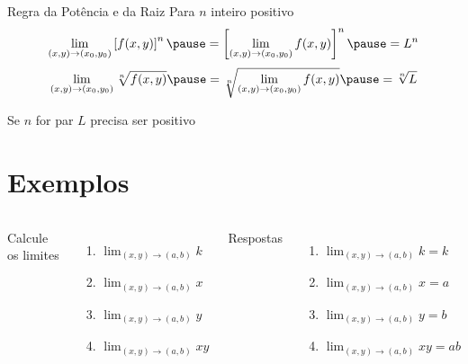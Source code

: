 \begin{frame}{Regra da Potência e da Raiz}
  Para $n$ inteiro positivo
  \pause
  \[
    \lim_{(x, y)\to(x_0, y_0)} \left[f(x, y)\right]^n
    \pause =
    \left[\lim_{(x, y)\to(x_0, y_0)} f(x, y)\right]^n
    \pause =
    L^n
  \]
  \pause
  \vspace{\baselineskip}
  \[
    \lim_{(x, y)\to(x_0, y_0)} \sqrt[n]{f(x, y)}
    \pause =
    \sqrt[n]{\lim_{(x, y)\to(x_0, y_0)} f(x, y)}
    \pause =
    \sqrt[n]{L}
  \]

  \pause
  Se $n$ for par $L$ precisa ser positivo
\end{frame}

\section{Exemplos}

\begin{question}
\begin{columns}[t]
  Calcule os limites
  \vspace{0.5\baselineskip}
  \begin{enumerate}
    \setlength\itemsep{1.5em}
    \item \(\lim_{(x, y)\to(a, b)} k\)
    \item \(\lim_{(x, y)\to(a, b)} x\)
    \item \(\lim_{(x, y)\to(a, b)} y\)
    \item \(\lim_{(x, y)\to(a, b)} xy\)
  \end{enumerate}
  \pause
  Respostas
  \pause
  \vspace{0.5\baselineskip}
  \begin{enumerate}[<+->]
    \setlength\itemsep{1.5em}
    \item \(\lim_{(x, y)\to(a, b)} k  = k  \)
    \item \(\lim_{(x, y)\to(a, b)} x  = a  \)
    \item \(\lim_{(x, y)\to(a, b)} y  = b  \)
    \item \(\lim_{(x, y)\to(a, b)} xy = ab \)
  \end{enumerate}
\end{columns}
\end{question}

